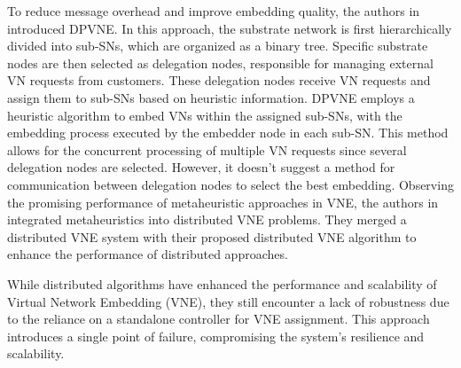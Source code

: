 To reduce message overhead and improve embedding quality, the authors in~\cite{beck2015distributed} introduced DPVNE. In this approach, the substrate network is first hierarchically divided into sub-SNs, which are organized as a binary tree. Specific substrate nodes are then selected as delegation nodes, responsible for managing external VN requests from customers. These delegation nodes receive VN requests and assign them to sub-SNs based on heuristic information. DPVNE employs a heuristic algorithm to embed VNs within the assigned sub-SNs, with the embedding process executed by the embedder node in each sub-SN. This method allows for the concurrent processing of multiple VN requests since several delegation nodes are selected. However, it doesn't suggest a method for communication between delegation nodes to select the best embedding.
%
Observing the promising performance of metaheuristic approaches in VNE, the authors in~\cite{song2019distributed} integrated metaheuristics into distributed VNE problems. They merged a distributed VNE system with their proposed distributed VNE algorithm to enhance the performance of distributed approaches.



While distributed algorithms have enhanced the performance and scalability of Virtual Network Embedding (VNE), they still encounter a lack of robustness due to the reliance on a standalone controller for VNE assignment. This approach introduces a single point of failure, compromising the system's resilience and scalability. 

